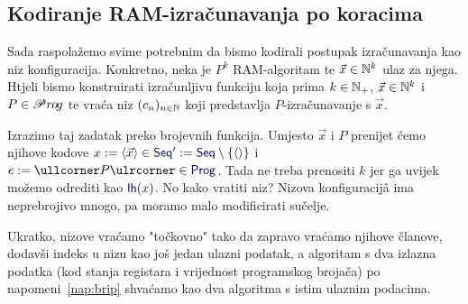 \subsection{Kodiranje RAM-izračunavanja po koracima}

Sada raspolažemo svime potrebnim da bismo kodirali postupak iz\-ra\-ču\-na\-va\-nja kao niz konfiguracija. Konkretno, neka je $P^k$ RAM-algoritam te $\vec x\in{\mathbb N}^k$ ulaz za njega. Htjeli bismo konstruirati izračunljivu funkciju koja prima $k\in{\mathbb N}_+$, $\vec x\in{\mathbb N}^k$ i $P\in\mathscr Pr\mspace{-1mu}o\mspace{-2mu}g$ te vraća niz $(c_n)_{n\in{\mathbb N}}$ koji predstavlja $P$-izračunavanje s $\vec x$.

Izrazimo taj zadatak preko brojevnih funkcija. Umjesto $\vec x$ i $P$ prenijet ćemo njihove kodove $x:=\langle\vec x\rangle\in\f{Seq}':=\f{Seq}\setminus\{\langle\rangle\}$ i $e:=\kprog{P}\in\f{Prog}$. Tada ne treba prenositi $k$ jer ga uvijek možemo odrediti kao $\f{lh}(x)$. No kako vratiti niz? Nizova konfiguracijâ ima neprebrojivo mnogo, pa moramo malo modificirati sučelje.

Ukratko, nizove vraćamo "točkovno" tako da zapravo vraćamo njihove članove, dodavši indeks u nizu kao još jedan ulazni podatak, a algoritam s dva izlazna podatka (kod stanja registara i vrijednost programskog brojača) po napomeni~\ref{nap:brip} shvaćamo kao dva algoritma s istim ulaznim podacima. %


